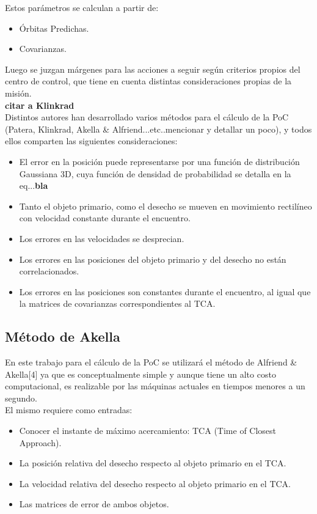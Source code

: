 Estos par\'ametros se calculan a partir de:
\begin{itemize}
 \item \'Orbitas Predichas.
 \item Covarianzas.
\end{itemize}

Luego se juzgan m\'argenes para las acciones a seguir seg\'un criterios propios del centro de control, que tiene en cuenta distintas consideraciones propias de la misi\'on.\\ 



{\bf{citar a Klinkrad}}
\\
Distintos autores han desarrollado varios m\'etodos para el c\'alculo de la PoC (Patera, Klinkrad, Akella \& Alfriend...etc..mencionar y detallar un poco), y todos ellos comparten las siguientes consideraciones:\\
\begin{itemize}
 \item El error en la posici\'on puede representarse por una funci\'on de distribuci\'on Gaussiana 3D, cuya funci\'on de densidad de probabilidad se detalla en la eq...{\bf{bla}} 
 \item Tanto el objeto primario, como el desecho se mueven en movimiento rectil\'ineo con velocidad constante durante el encuentro.
 \item Los errores en las velocidades se desprecian.
 \item Los errores en las posiciones del objeto primario y del desecho no est\'an correlacionados.
 \item Los errores en las posiciones son constantes durante el encuentro, al igual que la matrices de covarianzas correspondientes al TCA.
\end{itemize}

\subsection*{M\'etodo de Akella}
En este trabajo para el c\'alculo de la PoC se utilizar\'a el m\'etodo de Alfriend \& Akella[4] ya que es conceptualmente simple y aunque tiene un alto costo computacional, es realizable por las m\'aquinas actuales en tiempos menores a un segundo.\\

El mismo requiere como entradas:
\begin{itemize}
 \item Conocer el instante de m\'aximo acercamiento: TCA (Time of Closest Approach).
 \item La posici\'on relativa del desecho respecto al objeto primario en el TCA.
 \item La velocidad relativa del desecho respecto al objeto primario en el TCA.
 \item Las matrices de error de ambos objetos.
\end{itemize}

